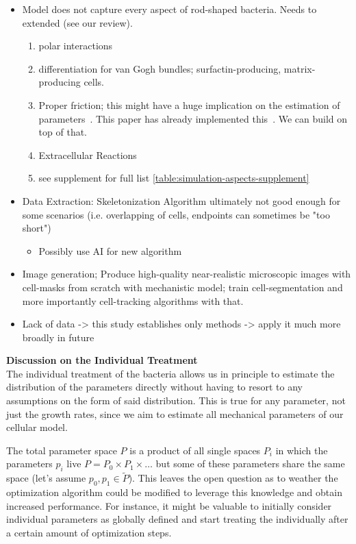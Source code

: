\documentclass{article}
\begin{document}
\begin{itemize}
    \item Model does not capture every aspect of rod-shaped bacteria. Needs to extended (see our
        review).
    \begin{enumerate}
        \item polar interactions
        \item differentiation for van Gogh bundles; surfactin-producing, matrix-producing cells.
        \item Proper friction; this might have a huge implication on the estimation of
            parameters~\cite{Grant2014}.
            This paper has already implemented this~\cite{Doumic2020}.
            We can build on top of that.
        \item Extracellular Reactions~\cite{Li2025}
        \item see supplement for full list \ref{table:simulation-aspects-supplement}
    \end{enumerate}
    \item Data Extraction: Skeletonization Algorithm ultimately not good enough for some scenarios
        (i.e. overlapping of cells, endpoints can sometimes be "too short")
    \begin{itemize}
        \item Possibly use AI for new algorithm
    \end{itemize}
    \item Image generation; Produce high-quality near-realistic microscopic images with cell-masks
        from scratch with mechanistic model; train cell-segmentation and more importantly
        cell-tracking algorithms with that.
    \item Lack of data -> this study establishes only methods -> apply it much more broadly in
        future
\end{itemize}

\textbf{Discussion on the Individual Treatment}\\
The individual treatment of the bacteria allows us in principle to estimate the distribution of the
parameters directly without having to resort to any assumptions on the form of said distribution.
This is true for any parameter, not just the growth rates, since we aim to estimate all mechanical
parameters of our cellular model.

The total parameter space $P$ is a product of all single spaces $P_i$ in which the parameters
$p_i$ live $P=P_0\times P_1\times\dots$ but some of these parameters share the same space (let's
assume $p_0,p_1\in \tilde{P}$).
This leaves the open question as to weather the optimization algorithm could be modified to leverage
this knowledge and obtain increased performance.
For instance, it might be valuable to initially consider individual parameters as globally defined
and start treating the individually after a certain amount of optimization steps.
\end{document}
